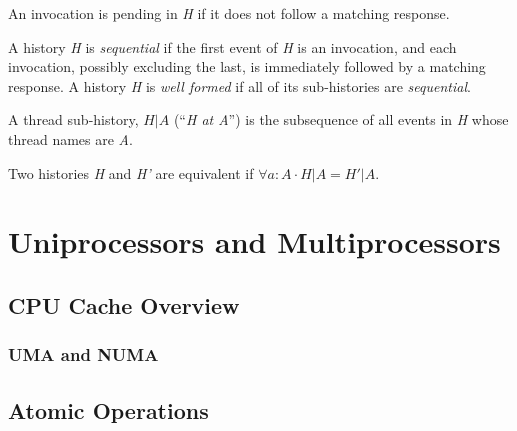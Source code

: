 \begin{definition}
An invocation is pending in \emph{H} if it does not follow a matching response.    
\end{definition}

\begin{definition}[History]
A history \emph{H} is \emph{sequential} if the first event of \emph{H} is an invocation, and each invocation, possibly excluding the last, is immediately followed by a matching response. A history \emph{H} is \emph{well formed} if all of its sub-histories are \emph{sequential}.
\end{definition}

\begin{definition}
A thread sub-history, $H|A$  (``\emph{H at A}'') is the subsequence of all events in \emph{H} whose thread names are \emph{A}.
\end{definition}

\begin{definition}[Equivalence]
Two histories \emph{H} and \emph{H'} are equivalent if $\forall a:A \cdot H|A = H'|A$.
\end{definition}

\section{Uniprocessors and Multiprocessors}

\subsection{CPU Cache Overview}

\subsubsection{UMA and NUMA}
% 

\subsection{Atomic Operations}

